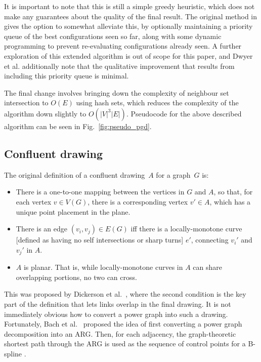 It is important to note that this is still a simple greedy heuristic, which does not make any guarantees about the quality of the final result.
The original method in \cite{Dwyer2014} gives the option to somewhat alleviate this, by optionally maintaining a priority queue of the best configurations seen so far, along with some dynamic programming to prevent re-evaluating configurations already seen.
A further exploration of this extended algorithm is out of scope for this paper, and Dwyer et al. \cite{Dwyer2014} additionally note that the qualitative improvement that results from including this priority queue is minimal.

The final change involves bringing down the complexity of neighbour set intersection to $O(E)$ using hash sets, which reduces the complexity of the algorithm down slightly to $O(|V|^3|E|)$.
Pseudocode for the above described algorithm can be seen in Fig.~\ref{fig:pseudo_pgd}.

\subsection{Confluent drawing}
\label{sec:confluent_definition}
The original definition of a confluent drawing~$A$ for a graph~$G$ is:
\begin{mdframed}[backgroundcolor=WhiteSmoke]
\begin{itemize}[leftmargin=*]
  \item There is a one-to-one mapping between the vertices in $G$ and $A$, so that, for each vertex $v\in V(G)$, there is a corresponding vertex $v'\in A$, which has a unique point placement in the plane.
  \item There is an edge $(v_i,v_j) \in E(G)$ iff there is a locally-monotone curve [defined as having no self intersections or sharp turns] $e'$, connecting $v_i'$ and $v_j'$ in $A$. 
  \item $A$ is planar. That is, while locally-monotone curves in $A$ can share overlapping portions, no two can cross.
\end{itemize}
\end{mdframed}
This was proposed by Dickerson et al.\ \cite{Dickerson2005}, where the second condition is the key part of the definition that lets links overlap in the final drawing.
It is not immediately obvious how to convert a power graph into such a drawing. Fortunately, Bach et al.\ \cite{Bach2017} proposed the idea of first converting a power graph decomposition into an ARG. Then, for each adjacency, the graph-theoretic shortest path through the ARG is used as the sequence of control points for a B-spline \cite{Sederberg2005}.

